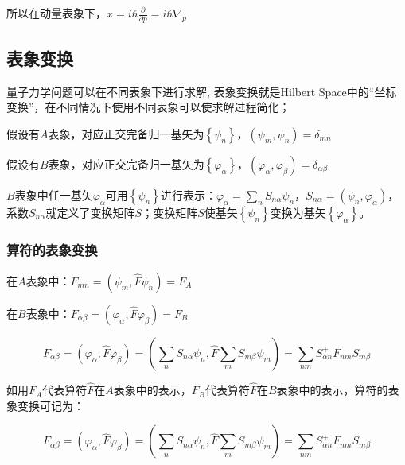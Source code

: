 所以在动量表象下，$\hat x = i\hbar \frac{\partial }{{\partial p}} = i\hbar \nabla _p $




\subsection{表象变换}


量子力学问题可以在不同表象下进行求解, 表象变换就是Hilbert
Space中的``坐标变换''，在不同情况下使用不同表象可以使求解过程简化；

假设有$A$表象，对应正交完备归一基矢为$\left\{ {\psi _n } \right\}$，$\left( {\psi _m ,\psi _n } \right) = \delta _{mn} $

假设有$B$表象，对应正交完备归一基矢为$\left\{ {\varphi _\alpha  } \right\}$，$\left( {\varphi _\alpha  ,\varphi _\beta  } \right) = \delta _{\alpha \beta } $

$B$表象中任一基矢$\varphi _\alpha  $可用$\left\{ {\psi _n } \right\}$进行表示：$\varphi _\alpha   = \sum\limits_n {S_{n\alpha } \psi _n } $，$S_{n\alpha }  = \left( {\psi _n ,\varphi _\alpha  } \right)$，系数$S_{n\alpha } $就定义了变换矩阵$S$；变换矩阵$S$使基矢$\left\{ {\psi _n } \right\}$变换为基矢$\left\{ {\varphi _\alpha  } \right\}$。

\subsubsection{算符的表象变换}

在$A$表象中：$F_{mn}  = \left( {\psi _m ,\widehat F\psi _n } \right) = F_A $

在$B$表象中：$F_{\alpha \beta }  = \left( {\varphi _\alpha  ,\widehat F\varphi _\beta  } \right) = F_B $

\begin{equation}\label{19-8}
F_{\alpha \beta }  = \left( {\varphi _\alpha  ,\widehat F\varphi _\beta  } \right) = \left( {\sum\limits_n {S_{n\alpha } \psi _n } ,\widehat F\sum\limits_m {S_{m\beta } \psi _m } } \right)  = \sum\limits_{nm} {S_{\alpha n}^ +  F_{nm} S_{m\beta } }
\end{equation}

如用$F_A$代表算符$\hat F$在$A$表象中的表示，$F_B$代表算符$\hat F$在$B$表象中的表示，算符的表象变换可记为：

\begin{equation}\label{19-9}
F_{\alpha \beta }  = \left( {\varphi _\alpha  ,\widehat F\varphi _\beta  } \right) = \left( {\sum\limits_n {S_{n\alpha } \psi _n } ,\widehat F\sum\limits_m {S_{m\beta } \psi _m } } \right)   = \sum\limits_{nm} {S_{\alpha n}^ +  F_{nm} S_{m\beta } }
\end{equation}


